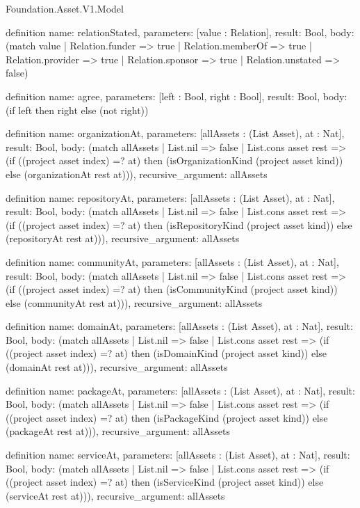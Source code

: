 \begin{lexlean}{Foundation.Asset.V1.Model}
\begin{semanticmodule}
definition{
  name: relationStated,
  parameters: [value : Relation],
  result: Bool,
  body: (match value
    | Relation.funder => true
    | Relation.memberOf => true
    | Relation.provider => true
    | Relation.sponsor => true
    | Relation.unstated => false)
}

definition{
  name: agree,
  parameters: [left : Bool, right : Bool],
  result: Bool,
  body: (if left then right else (not right))
}

definition{
  name: organizationAt,
  parameters: [allAssets : (List Asset), at : Nat],
  result: Bool,
  body: (match allAssets
    | List.nil => false
    | List.cons asset rest => (if ((project asset index) =? at) then (isOrganizationKind (project asset kind)) else (organizationAt rest at))),
  recursive_argument: allAssets
}

definition{
  name: repositoryAt,
  parameters: [allAssets : (List Asset), at : Nat],
  result: Bool,
  body: (match allAssets
    | List.nil => false
    | List.cons asset rest => (if ((project asset index) =? at) then (isRepositoryKind (project asset kind)) else (repositoryAt rest at))),
  recursive_argument: allAssets
}

definition{
  name: communityAt,
  parameters: [allAssets : (List Asset), at : Nat],
  result: Bool,
  body: (match allAssets
    | List.nil => false
    | List.cons asset rest => (if ((project asset index) =? at) then (isCommunityKind (project asset kind)) else (communityAt rest at))),
  recursive_argument: allAssets
}

definition{
  name: domainAt,
  parameters: [allAssets : (List Asset), at : Nat],
  result: Bool,
  body: (match allAssets
    | List.nil => false
    | List.cons asset rest => (if ((project asset index) =? at) then (isDomainKind (project asset kind)) else (domainAt rest at))),
  recursive_argument: allAssets
}

definition{
  name: packageAt,
  parameters: [allAssets : (List Asset), at : Nat],
  result: Bool,
  body: (match allAssets
    | List.nil => false
    | List.cons asset rest => (if ((project asset index) =? at) then (isPackageKind (project asset kind)) else (packageAt rest at))),
  recursive_argument: allAssets
}

definition{
  name: serviceAt,
  parameters: [allAssets : (List Asset), at : Nat],
  result: Bool,
  body: (match allAssets
    | List.nil => false
    | List.cons asset rest => (if ((project asset index) =? at) then (isServiceKind (project asset kind)) else (serviceAt rest at))),
  recursive_argument: allAssets
}


\end{semanticmodule}
\end{lexlean}
